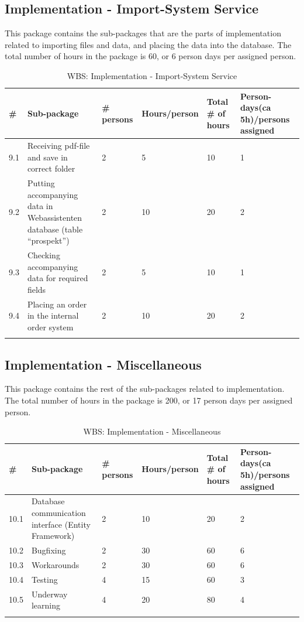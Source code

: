 \subsection{Implementation - Import-System Service}
This package contains the sub-packages that are the parts of implementation related to importing files and data, and placing the data into the database. The total number of hours in the package is 60, or 6 person days per assigned person.
\begin{longtable}{|p{0.7cm}|p{3cm}|p{1.8cm}|p{2.5cm}|p{2cm}|p{2.8cm}|}
\hline
\# & Sub-package & \# persons & Hours/person & Total \# of hours & Person-days(ca 5h)/persons assigned\\ 
\hline
9.1 & Receiving pdf-file and save in correct folder & 2 & 5 & 10 & 1\\ 
\hline
9.2 & Putting accompanying data in Webassistenten database (table “prospekt”) & 2 & 10 & 20 & 2\\ 
\hline
9.3 & Checking accompanying data for required fields & 2 & 5 & 10 & 1\\ 
\hline
9.4 & Placing an order in the internal order system & 2 & 10 & 20 & 2\\ 
\hline\caption{WBS: Implementation - Import-System Service}
\end{longtable}

\newpage
\subsection{Implementation - Miscellaneous}
This package contains the rest of the sub-packages related to implementation. The total number of hours in the package is 200, or 17 person days per assigned person.
\begin{longtable}{|p{0.7cm}|p{3cm}|p{1.8cm}|p{2.5cm}|p{2cm}|p{2.8cm}|}
\hline
\# & Sub-package & \# persons & Hours/person & Total \# of hours & Person-days(ca 5h)/persons assigned\\ 
\hline
10.1 & Database communication interface (Entity Framework) & 2 & 10 & 20 & 2\\ 
\hline
10.2 & Bugfixing & 2 & 30 & 60 & 6\\ 
\hline
10.3 & Workarounds & 2 & 30 & 60 & 6\\ 
\hline
10.4 & Testing & 4 & 15 & 60 & 3\\ 
\hline
10.5 & Underway learning & 4 & 20 & 80 & 4\\ 
\hline
\caption{WBS: Implementation - Miscellaneous}
\end{longtable}


